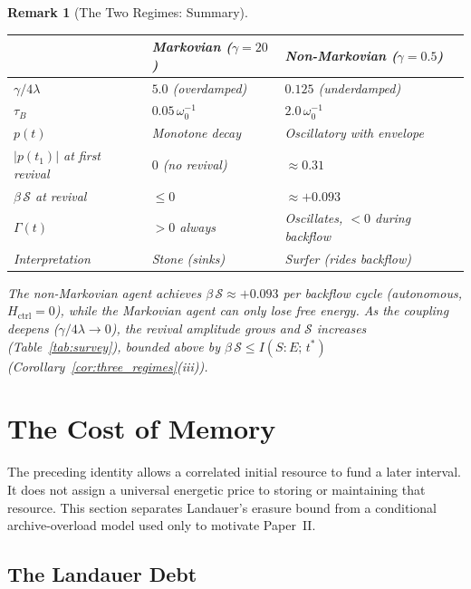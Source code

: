 \documentclass[12pt]{article}
\newtheorem{remark}[theorem]{Remark}
\begin{document}
\begin{remark}[The Two Regimes: Summary]
\label{rem:two_regimes}
\begin{center}
\begin{tabular}{@{}lll@{}}
\toprule
& \textbf{Markovian ($\gamma = 20$)}
& \textbf{Non-Markovian ($\gamma = 0.5$)} \\
\midrule
$\gamma / 4\lambda$ & $5.0$ (overdamped)
  & $0.125$ (underdamped) \\
$\tau_B$ & $0.05\,\omega_0^{-1}$
  & $2.0\,\omega_0^{-1}$ \\
$p(t)$ & Monotone decay
  & Oscillatory with envelope \\
$|p(t_1)|$ at first revival & $0$ (no revival)
  & $\approx 0.31$ \\
$\beta\,\mathcal{S}$ at revival & $\leq 0$
  & $\approx +0.093$ \\
$\Gamma(t)$ & $> 0$ always
  & Oscillates, $< 0$ during backflow \\
Interpretation & Stone (sinks)
  & Surfer (rides backflow) \\
\bottomrule
\end{tabular}
\end{center}
The non-Markovian agent achieves
$\beta\,\mathcal{S} \approx +0.093$
per backflow cycle (autonomous, $H_{\mathrm{ctrl}} = 0$),
while the Markovian agent can only lose free energy.
As the coupling deepens ($\gamma/4\lambda \to 0$), the
revival amplitude grows and
$\mathcal{S}$ increases
(Table~\ref{tab:survey}), bounded above by
$\beta\,\mathcal{S} \leq I(S{:}E;\, t^*)$
(Corollary~\ref{cor:three_regimes}(iii)).
\end{remark}

\section{The Cost of Memory}
\label{sec:cost}

The preceding identity allows a correlated initial resource to fund a
later interval.  It does not assign a universal energetic price to
storing or maintaining that resource.  This section separates
Landauer's erasure bound from a conditional archive-overload model used
only to motivate Paper~II.

\subsection{The Landauer Debt}
\end{document}
